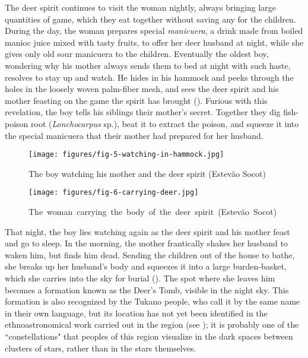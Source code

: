 \documentclass[output=paper,
modfonts,nonflat
]{langsci/langscibook}
\begin{document}
	The deer spirit continues to visit the woman nightly, always bringing large quantities of game, which they eat together without saving any for the children. During the day, the woman prepares special \textit{manicuera}, a drink made from boiled manioc juice mixed with tasty fruits, to offer her deer husband at night, while she gives only old sour manicuera to the children. Eventually the oldest boy, wondering why his mother always sends them to bed at night with such haste, resolves to stay up and watch. He hides in his hammock and peeks through the holes in the loosely woven palm-fiber mesh, and sees the deer spirit and his mother feasting on the game the spirit has brought (). Furious with this revelation, the boy tells his siblings their mother’s secret. Together they dig fish-poison root (\textit{Lonchocarpus} sp.), beat it to extract the poison, and squeeze it into the special manicuera that their mother had prepared for her husband.
    
\begin{figure}
  \texttt{[image: figures/fig-5-watching-in-hammock.jpg]}
  \caption{The boy watching his mother and the deer spirit (Estevão Socot)}
  \label{fig:hup:5}

\end{figure}
    \begin{figure}[b]
  \texttt{[image: figures/fig-6-carrying-deer.jpg]}
  \caption{\mbox{The woman carrying the body of the deer spirit (Estevão Socot)}}
  \label{fig:hup:6}
\end{figure}    
	That night, the boy lies watching again as the deer spirit and his mother feast and go to sleep. In the morning, the mother frantically shakes her husband to waken him, but finds him dead. Sending the children out of the house to bathe, she breaks up her husband’s body and squeezes it into a large burden-basket, which she carries into the sky for burial (). The spot where she leaves him becomes a formation known as the Deer’s Tomb, visible in the night sky. This formation is also recognized by the Tukano people, who call it by the same name in their own language, but its location has not yet been identified in the ethnoastronomical work carried out in the region (see \citealt{Cardoso2007,Oliveira2010}); it is probably one of the “constellations" that peoples of this region visualize in the dark spaces between clusters of stars, rather than in the stars themselves. 
	
\end{document}
